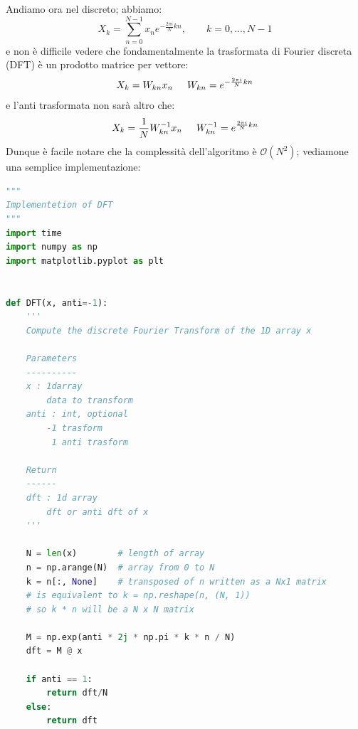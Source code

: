 \documentclass[10pt,a4paper]{article}
\begin{document}
\FloatBarrier
Andiamo ora nel discreto; abbiamo:
\begin{equation}
X_k = \sum_{n=0}^{N-1} x_n e^{-\frac{2 \pi i}{N} kn}, \qquad k = 0, \dots, N-1
\end{equation}
e non è difficile vedere che fondamentalmente la trasformata di Fourier discreta (DFT) è un prodotto matrice per vettore:
\begin{equation}
X_k = W_{k n} x_n \hspace{5 mm} W_{k n} = e^{-\frac{2 \pi i}{N} kn} 
\end{equation}
e l'anti trasformata non sarà altro che:
\begin{equation}
X_k = \frac{1}{N} W_{k n}^{-1} x_n \hspace{5 mm} W_{k n}^{-1} = e^{\frac{2 \pi i}{N} kn} 
\end{equation}
Dunque è facile notare che la complessità dell'algoritmo è $\mathcal{O}(N^2)$; vediamone una semplice implementazione:

\begin{lstlisting}[language=Python]
"""
Implementetion of DFT
"""
import time
import numpy as np
import matplotlib.pyplot as plt


def DFT(x, anti=-1):
    '''
    Compute the discrete Fourier Transform of the 1D array x

    Parameters
    ----------
    x : 1darray
        data to transform
    anti : int, optional
        -1 trasform
         1 anti trasform

    Return
    ------
    dft : 1d array
        dft or anti dft of x
    '''

    N = len(x)        # length of array
    n = np.arange(N)  # array from 0 to N
    k = n[:, None]    # transposed of n written as a Nx1 matrix
    # is equivalent to k = np.reshape(n, (N, 1))
    # so k * n will be a N x N matrix

    M = np.exp(anti * 2j * np.pi * k * n / N)
    dft = M @ x

    if anti == 1:
        return dft/N
    else:
        return dft
\end{lstlisting}
\end{document}
